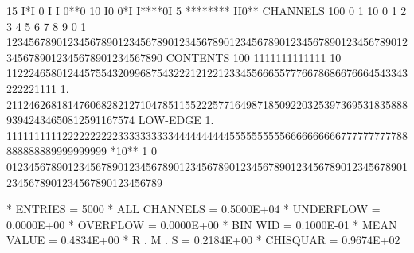 \begin{Listing}
       15                    I*I                               0 I  I                                      0**0
       10                I0 0*I                                                                              I****0I
        5            ********                                                                                  II0**
 CHANNELS 100   0                                                                                                  1   
           10   0        1         2         3         4         5         6         7         8         9         0   
            1   1234567890123456789012345678901234567890123456789012345678901234567890123456789012345678901234567890   
 CONTENTS 100                          1111111111111                                                                
           10                 112224658012445755432099687543222121221233455666557776678686676664543343222221111     
            1.       21124626818147606828212710478511552225771649871850922032539736953183588893942434650812591167574
 LOW-EDGE   1.            111111111122222222223333333333444444444455555555556666666666777777777788888888889999999999
 *10**  1   0   0123456789012345678901234567890123456789012345678901234567890123456789012345678901234567890123456789
 
 * ENTRIES =       5000      * ALL CHANNELS = 0.5000E+04      * UNDERFLOW = 0.0000E+00      * OVERFLOW = 0.0000E+00
 * BIN WID = 0.1000E-01      * MEAN VALUE   = 0.4834E+00      * R . M . S = 0.2184E+00
 * CHISQUAR  =  0.9674E+02
\end{Listing}

\endinput

